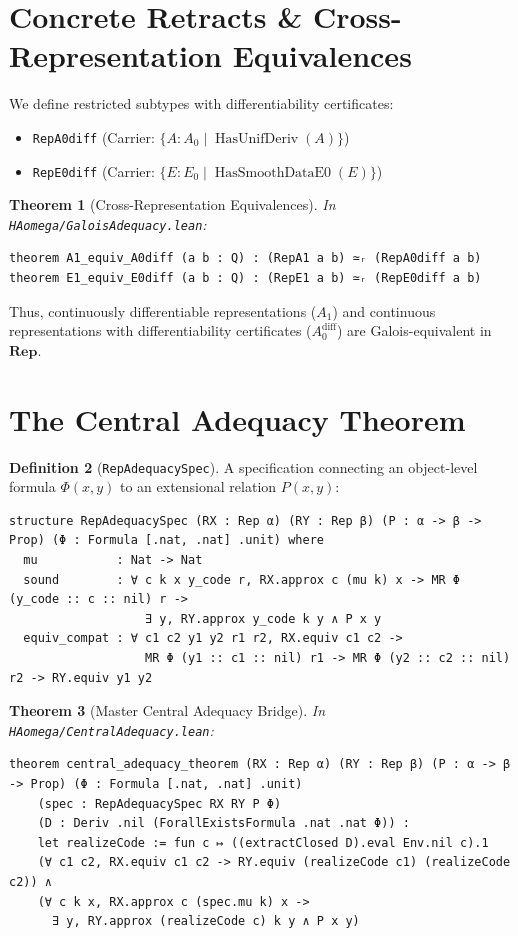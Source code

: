 \documentclass[11pt,a4paper]{article}
\newtheorem{theorem}{Theorem}[section]
\theoremstyle{definition}
\newtheorem{definition}[theorem]{Definition}
\theoremstyle{remark}
\newcommand{\Rep}{\ensuremath{\mathbf{Rep}}}
\begin{document}
\section{Concrete Retracts \& Cross-Representation Equivalences}

We define restricted subtypes with differentiability certificates:
\begin{itemize}
    \item \texttt{RepA0diff} (Carrier: $\{ A : A_0 \mid \operatorname{HasUnifDeriv}(A) \}$)
    \item \texttt{RepE0diff} (Carrier: $\{ E : E_0 \mid \operatorname{HasSmoothDataE0}(E) \}$)
\end{itemize}

\begin{theorem}[Cross-Representation Equivalences]
In \texttt{HAomega/GaloisAdequacy.lean}:
\begin{lstlisting}[language=Lean]
theorem A1_equiv_A0diff (a b : Q) : (RepA1 a b) ≃ᵣ (RepA0diff a b)
theorem E1_equiv_E0diff (a b : Q) : (RepE1 a b) ≃ᵣ (RepE0diff a b)
\end{lstlisting}
\end{theorem}
Thus, continuously differentiable representations ($A_1$) and continuous representations with differentiability certificates ($A_0^{\text{diff}}$) are Galois-equivalent in $\Rep$.

\section{The Central Adequacy Theorem}

\begin{definition}[\texttt{RepAdequacySpec}]
A specification connecting an object-level formula $\Phi(x, y)$ to an extensional relation $P(x, y)$:
\begin{lstlisting}[language=Lean]
structure RepAdequacySpec (RX : Rep α) (RY : Rep β) (P : α -> β -> Prop) (Φ : Formula [.nat, .nat] .unit) where
  mu           : Nat -> Nat
  sound        : ∀ c k x y_code r, RX.approx c (mu k) x -> MR Φ (y_code :: c :: nil) r ->
                   ∃ y, RY.approx y_code k y ∧ P x y
  equiv_compat : ∀ c1 c2 y1 y2 r1 r2, RX.equiv c1 c2 -> 
                   MR Φ (y1 :: c1 :: nil) r1 -> MR Φ (y2 :: c2 :: nil) r2 -> RY.equiv y1 y2
\end{lstlisting}
\end{definition}

\begin{theorem}[Master Central Adequacy Bridge]
In \texttt{HAomega/CentralAdequacy.lean}:
\begin{lstlisting}[language=Lean]
theorem central_adequacy_theorem (RX : Rep α) (RY : Rep β) (P : α -> β -> Prop) (Φ : Formula [.nat, .nat] .unit)
    (spec : RepAdequacySpec RX RY P Φ)
    (D : Deriv .nil (ForallExistsFormula .nat .nat Φ)) :
    let realizeCode := fun c ↦ ((extractClosed D).eval Env.nil c).1
    (∀ c1 c2, RX.equiv c1 c2 -> RY.equiv (realizeCode c1) (realizeCode c2)) ∧
    (∀ c k x, RX.approx c (spec.mu k) x ->
      ∃ y, RY.approx (realizeCode c) k y ∧ P x y)
\end{lstlisting}
\end{theorem}
\end{document}
